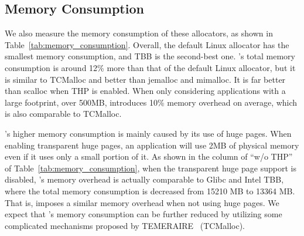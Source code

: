 \subsection{Memory Consumption}
\label{sec:memory}

We also measure the memory consumption of these allocators, as shown in Table~\ref{tab:memory_consumption}.
Overall, the default Linux allocator has the smallest memory consumption, and TBB is the second-best one. \NM{}'s total memory consumption is around 12\% more than that of the default Linux allocator, but it is similar to TCMalloc and better than jemalloc and mimalloc. It is far better than scalloc when THP is enabled. When only considering applications with a large footprint, over 500MB, \NM{} introduces 10\% memory overhead on average, which is also comparable to TCMalloc.  

\NM{}'s higher memory consumption is mainly caused by its use of huge pages. When enabling transparent huge pages, an application will use 2MB of physical memory even if it uses only a small portion of it.
As shown in the column of ``w/o THP'' of Table~\ref{tab:memory_consumption}, when the transparent huge page support is disabled, \NM{}'s memory overhead is actually comparable to Glibc and Intel TBB, where the total memory consumption is decreased from 15210 MB to 13364 MB. That is, \NM{} imposes a similar memory overhead when not using huge pages. We expect that \NM{}'s memory consumption can be further reduced by utilizing some complicated mechanisms proposed by TEMERAIRE~\cite{TEMERAIRE} (TCMalloc).   

